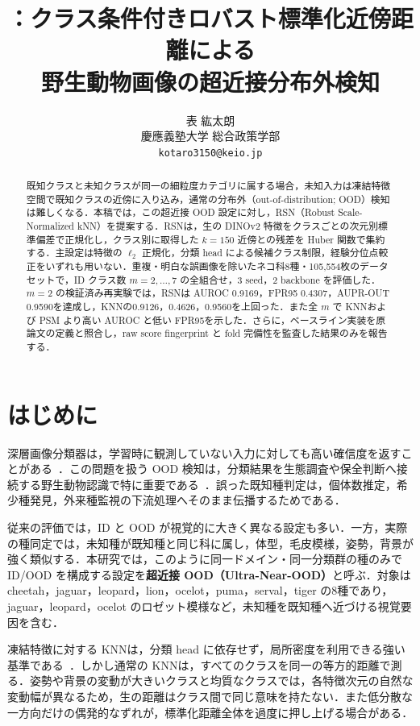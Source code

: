 \documentclass[uplatex,dvipdfmx,a4paper,10pt,twocolumn]{bxjsarticle}
\title{\RSN：クラス条件付きロバスト標準化近傍距離による\\
野生動物画像の超近接分布外検知}
\author{表 紘太朗\\
慶應義塾大学 総合政策学部\\
\texttt{kotaro3150@keio.jp}}
\date{}
\newcommand{\RSN}{RSN}
\newcommand{\knn}{KNN}
\begin{document}
\maketitle

\begin{abstract}
既知クラスと未知クラスが同一の細粒度カテゴリに属する場合，未知入力は凍結特徴空間で既知クラスの近傍に入り込み，通常の分布外（out-of-distribution; OOD）検知は難しくなる．本稿では，この超近接 OOD 設定に対し，\RSN（Robust Scale-Normalized kNN）を提案する．\RSN は，生の DINOv2 特徴をクラスごとの次元別標準偏差で正規化し，クラス別に取得した $k=150$ 近傍との残差を Huber 関数で集約する．主設定は特徴の $\ell_2$ 正規化，分類 head による候補クラス制限，経験分位点較正をいずれも用いない．重複・明白な誤画像を除いたネコ科8種・105,554枚のデータセットで，ID クラス数 $m=2,\ldots,7$ の全組合せ，3 seed，2 backbone を評価した．$m=2$ の検証済み再実験では，\RSN は AUROC 0.9169，FPR95 0.4307，AUPR-OUT 0.9590を達成し，\knn の0.9126，0.4626，0.9560を上回った．また全 $m$ で \knn および PSM より高い AUROC と低い FPR95を示した．さらに，ベースライン実装を原論文の定義と照合し，raw score fingerprint と fold 完備性を監査した結果のみを報告する．
\end{abstract}

\section{はじめに}

深層画像分類器は，学習時に観測していない入力に対しても高い確信度を返すことがある~\cite{hendrycks2017baseline}．この問題を扱う OOD 検知は，分類結果を生態調査や保全判断へ接続する野生動物認識で特に重要である~\cite{norouzzadeh2018automatically,tuia2022perspectives}．誤った既知種判定は，個体数推定，希少種発見，外来種監視の下流処理へそのまま伝播するためである．

従来の評価では，ID と OOD が視覚的に大きく異なる設定も多い．一方，実際の種同定では，未知種が既知種と同じ科に属し，体型，毛皮模様，姿勢，背景が強く類似する．本研究では，このように同一ドメイン・同一分類群の種のみで ID/OOD を構成する設定を\textbf{超近接 OOD（Ultra-Near-OOD）}と呼ぶ．対象は cheetah，jaguar，leopard，lion，ocelot，puma，serval，tiger の8種であり，jaguar，leopard，ocelot のロゼット模様など，未知種を既知種へ近づける視覚要因を含む．

凍結特徴に対する \knn は，分類 head に依存せず，局所密度を利用できる強い基準である~\cite{sun2022knn}．しかし通常の \knn は，すべてのクラスを同一の等方的距離で測る．姿勢や背景の変動が大きいクラスと均質なクラスでは，各特徴次元の自然な変動幅が異なるため，生の距離はクラス間で同じ意味を持たない．また低分散な一方向だけの偶発的なずれが，標準化距離全体を過度に押し上げる場合がある．
\end{document}
